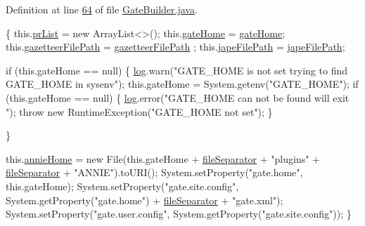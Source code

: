 Definition at line \hyperlink{L64}{64} of file \hyperlink{}{Gate\-Builder.\-java}.


\begin{DoxyCode}
                                 \{
        this.\hyperlink{classcom_1_1poly_1_1nlp_1_1filekommander_1_1gate_1_1_gate_builder_a4e56ddc3afefb48e751266e1e6449b7f}{prList} = \textcolor{keyword}{new} ArrayList<>();
        this.\hyperlink{classcom_1_1poly_1_1nlp_1_1filekommander_1_1gate_1_1_gate_builder_abdefcfc6edae8b7edf26f0381ed9da34}{gateHome} = \hyperlink{classcom_1_1poly_1_1nlp_1_1filekommander_1_1gate_1_1_gate_builder_abdefcfc6edae8b7edf26f0381ed9da34}{gateHome};
        this.\hyperlink{classcom_1_1poly_1_1nlp_1_1filekommander_1_1gate_1_1_gate_builder_adceaef80d20a83bd8c1cded83b90a692}{gazetteerFilePath} = \hyperlink{classcom_1_1poly_1_1nlp_1_1filekommander_1_1gate_1_1_gate_builder_adceaef80d20a83bd8c1cded83b90a692}{gazetteerFilePath}
      ;
        this.\hyperlink{classcom_1_1poly_1_1nlp_1_1filekommander_1_1gate_1_1_gate_builder_a58783e8638545aa5ea65a89aa1061dde}{japeFilePath} = \hyperlink{classcom_1_1poly_1_1nlp_1_1filekommander_1_1gate_1_1_gate_builder_a58783e8638545aa5ea65a89aa1061dde}{japeFilePath};

        \textcolor{keywordflow}{if} (this.gateHome == null) \{
            \hyperlink{classcom_1_1poly_1_1nlp_1_1filekommander_1_1gate_1_1_gate_builder_abbd1c14bf5a3ef4f39d4563dd498c467}{log}.warn(\textcolor{stringliteral}{"GATE\_HOME is not set trying to find GATE\_HOME in
       sysenv"});
            this.gateHome = System.getenv(\textcolor{stringliteral}{"GATE\_HOME"});
            \textcolor{keywordflow}{if} (this.gateHome == null) \{
                \hyperlink{classcom_1_1poly_1_1nlp_1_1filekommander_1_1gate_1_1_gate_builder_abbd1c14bf5a3ef4f39d4563dd498c467}{log}.error(\textcolor{stringliteral}{"GATE\_HOME can not be found will exit "});
                \textcolor{keywordflow}{throw} \textcolor{keyword}{new} RuntimeException(\textcolor{stringliteral}{"GATE\_HOME not set"});
            \}

        \}

        this.\hyperlink{classcom_1_1poly_1_1nlp_1_1filekommander_1_1gate_1_1_gate_builder_a4f34ff5f89a6a8a2ddcc72935cb6f51d}{annieHome} = \textcolor{keyword}{new} File(this.gateHome + \hyperlink{classcom_1_1poly_1_1nlp_1_1filekommander_1_1gate_1_1_gate_builder_aca691fb8ad715fd61ccf5845647c7bf2}{fileSeparator}
       + \textcolor{stringliteral}{"plugins"}
                + \hyperlink{classcom_1_1poly_1_1nlp_1_1filekommander_1_1gate_1_1_gate_builder_aca691fb8ad715fd61ccf5845647c7bf2}{fileSeparator} + \textcolor{stringliteral}{"ANNIE"}).toURI();
        System.setProperty(\textcolor{stringliteral}{"gate.home"}, this.gateHome);
        System.setProperty(\textcolor{stringliteral}{"gate.site.config"}, System.getProperty(\textcolor{stringliteral}{"gate.home"})
                + \hyperlink{classcom_1_1poly_1_1nlp_1_1filekommander_1_1gate_1_1_gate_builder_aca691fb8ad715fd61ccf5845647c7bf2}{fileSeparator} + \textcolor{stringliteral}{"gate.xml"});
        System.setProperty(\textcolor{stringliteral}{"gate.user.config"},
                System.getProperty(\textcolor{stringliteral}{"gate.site.config"}));
    \}
\end{DoxyCode}


